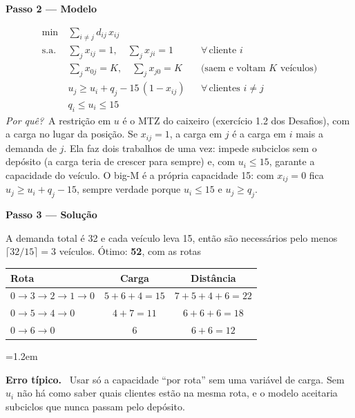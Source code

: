\documentclass[11pt,a4paper]{article}
\newcommand{\passo}[1]{\par\medskip\textbf{#1}\par}
\newcommand{\porque}{\textit{Por quê?}\ }
\newenvironment{nota}[1]{\par\smallskip\begin{list}{}{\leftmargin=1.2em\rightmargin=0pt}\item[]\textbf{#1.}\ }{\end{list}}
\begin{document}
\passo{Passo 2 --- Modelo}
\begin{align*}
  \min\ & \sum_{i\ne j} d_{ij}\,x_{ij}\\
  \text{s.a.}\ & \sum_{j} x_{ij} = 1, \quad \sum_{j} x_{ji} = 1 && \forall\,\text{cliente } i\\
  & \sum_{j} x_{0j} = K, \quad \sum_{j} x_{j0} = K && \text{(saem e voltam $K$ veículos)}\\
  & u_j \ge u_i + q_j - 15\,(1 - x_{ij}) && \forall\,\text{clientes } i\ne j\\
  & q_i \le u_i \le 15
\end{align*}
\porque A restrição em $u$ é o MTZ do caixeiro (exercício 1.2 dos Desafios), com a carga no lugar da posição. Se $x_{ij}=1$, a carga
em $j$ é a carga em $i$ mais a demanda de $j$. Ela faz dois trabalhos de uma vez: impede subciclos sem o depósito (a carga
teria de crescer para sempre) e, com $u_i\le15$, garante a capacidade do veículo. O big-M é a própria capacidade 15: com
$x_{ij}=0$ fica $u_j\ge u_i+q_j-15$, sempre verdade porque $u_i\le15$ e $u_j\ge q_j$.

\passo{Passo 3 --- Solução}
A demanda total é 32 e cada veículo leva 15, então são necessários pelo menos $\lceil32/15\rceil=3$ veículos. Ótimo:
\textbf{52}, com as rotas
\begin{center}
\begin{tabular}{lcc}
\toprule
Rota & Carga & Distância\\
\midrule
$0\to3\to2\to1\to0$ & $5+6+4=15$ & $7+5+4+6=22$\\
$0\to5\to4\to0$ & $4+7=11$ & $6+6+6=18$\\
$0\to6\to0$ & 6 & $6+6=12$\\
\bottomrule
\end{tabular}
\end{center}

\begin{nota}{Erro típico}
Usar só a capacidade ``por rota'' sem uma variável de carga. Sem $u_i$ não há como saber quais clientes estão na mesma rota,
e o modelo aceitaria subciclos que nunca passam pelo depósito.
\end{nota}

\clearpage
\end{document}
